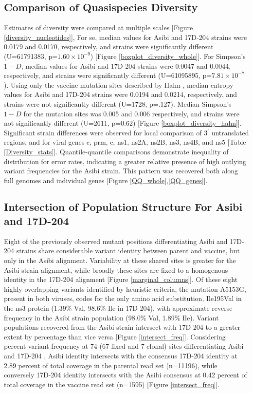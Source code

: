 \subsection{Comparison of Quasispecies Diversity} 
Estimates of diversity were compared at multiple scales [Figure \ref{diversity_nucleotides}], For \gls{se}, median values for Asibi and 17D-204 strains were 0.0179 and 0.0170, respectively, and strains were significantly different (U=61791383, p=$1.60 \times 10^{-9}$) [Figure \ref{boxplot_diversity_whole}]. For Simpson’s $1-D$, median values for Asibi and 17D-204 strains were 0.0047 and 0.0044, respectively, and strains were significantly different (U=61095895, p=$7.81 \times 10^{-7}$). Using only the vaccine mutation sites described by Hahn \parencite{Hahn:1987tw}, median entropy values for Asibi and 17D-204 strains were 0.0194 and 0.0214, respectively, and strains were not significantly different (U=1728, p=.127). Median Simpson’s $1-D$ for the mutation sites was 0.005 and 0.006 respectively, and strains were not significantly different (U=2611, p=0.62) [Figure \ref{boxplot_diversity_hahn}]. Significant strain differences were observed for local comparison of 3$^{\prime}$ untranslated regions, and for viral genes \gls{c}, \gls{prm}, \gls{e}, \gls{ns}1, \gls{ns}2A, \gls{ns}2B, \gls{ns}3, \gls{ns}4B, and \gls{ns}5 [Table \ref{Diversity_stats}]. Quantile-quantile comparisons demonstrate inequality of distribution for error rates, indicating a greater relative presence of high outlying variant frequencies for the Asibi strain. This pattern was recovered both along full genomes and individual genes [Figure \ref{QQ_whole},\ref{QQ_genes}].
\subsection{Intersection of Population Structure For Asibi and 17D-204}
Eight of the previously observed mutant positions differentiating Asibi and 17D-204 strains share considerable variant identity between parent and vaccine, but only in the Asibi alignment. Variability at these shared sites is greater for the Asibi strain alignment, while broadly these sites are fixed to a homogenous identity in the 17D-204 alignment [Figure \ref{marginal_columns}]. Of these eight highly overlapping variants identified by heuristic criteria, the mutation A5153G, present in both viruses, codes for the only amino acid substitution, Ile195Val in the \gls{ns}3 protein (1.39\% Val, 98.6\% Ile in 17D-204), with approximate reverse frequency in the Asibi strain population (98.0\% Val, 1.89\% Ile). 
Variant populations recovered from the Asibi strain intersect with 17D-204 to a greater extent by percentage than vice versa [Figure \ref{intersect_freq}]. Considering percent variant frequency at 74 (67 fixed and 7 clonal) sites differentiating Asibi and 17D-204 \parencite{Hahn:1987tw}, Asibi identity intersects with the consensus 17D-204 identity at 2.89 percent of total coverage in the parental read set (n=11196), while conversely 17D-204 identity intersects with the Asibi consensus at 0.42 percent of total coverage in the vaccine read set (n=1595) [Figure \ref{intersect_freq}]. 

